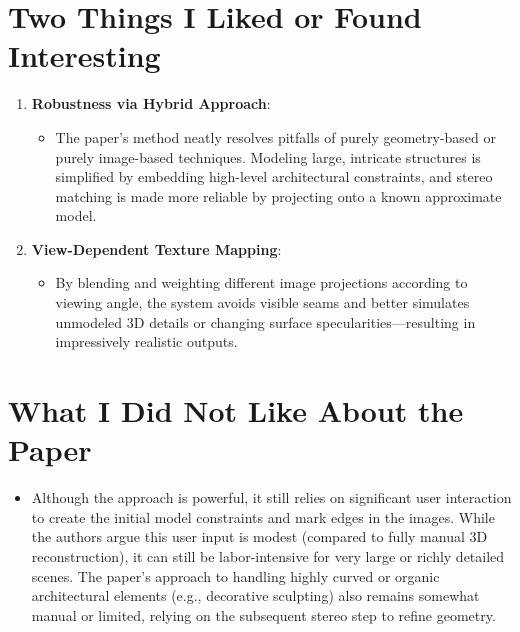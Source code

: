 \documentclass[12pt]{article}
\begin{document}
\section{Two Things I Liked or Found Interesting}
\begin{enumerate}[noitemsep]
    \item \textbf{Robustness via Hybrid Approach}:
    \begin{itemize}[noitemsep]
        \item The paper's method neatly resolves pitfalls of purely geometry-based or purely image-based techniques. Modeling large, intricate structures is simplified by embedding high-level architectural constraints, and stereo matching is made more reliable by projecting onto a known approximate model.
    \end{itemize}
    \item \textbf{View-Dependent Texture Mapping}:
    \begin{itemize}[noitemsep]
        \item By blending and weighting different image projections according to viewing angle, the system avoids visible seams and better simulates unmodeled 3D details or changing surface specularities—resulting in impressively realistic outputs.
    \end{itemize}
\end{enumerate}

\section{What I Did Not Like About the Paper}
\begin{itemize}[noitemsep]
    \item Although the approach is powerful, it still relies on significant user interaction to create the initial model constraints and mark edges in the images. While the authors argue this user input is modest (compared to fully manual 3D reconstruction), it can still be labor-intensive for very large or richly detailed scenes. The paper's approach to handling highly curved or organic architectural elements (e.g., decorative sculpting) also remains somewhat manual or limited, relying on the subsequent stereo step to refine geometry.
\end{itemize}
\end{document}
